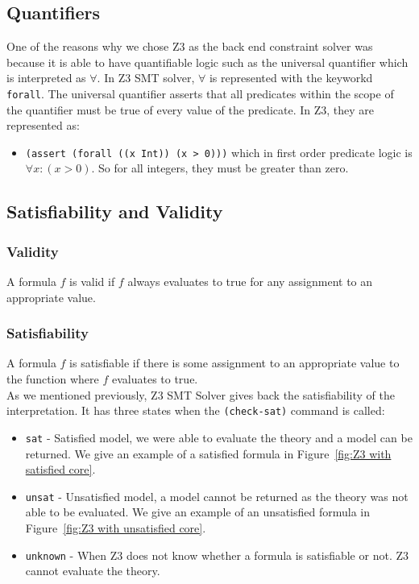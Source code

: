 \documentclass[a4paper]{report}
\begin{document}
\subsection{Quantifiers}
One of the reasons why we chose Z3 as the back end constraint solver was because it is able to have quantifiable logic such as the universal quantifier which is interpreted as  $\forall$. In Z3 SMT solver, $\forall$ is represented with the keyworkd \texttt{forall}. The universal quantifier asserts that all predicates within the scope of the quantifier must be true of every value of the predicate. In Z3, they are represented as:
\begin{itemize}
\item \texttt{(assert (forall ((x Int)) (x > 0)))} which in first order predicate logic is $\forall x: (x > 0)$. So for all integers, they must be greater than zero.
\end{itemize}

\subsection{Satisfiability and Validity}
\subsubsection{Validity}
A formula $f$ is valid if $f$ always evaluates to true for any assignment to an appropriate value. \\

\subsubsection{Satisfiability}
A formula $f$ is satisfiable if there is some assignment to an appropriate value to the function where $f$ evaluates to true.\\

As we mentioned previously, Z3 SMT Solver gives back the satisfiability of the interpretation. It has three states when the \texttt{(check-sat)} command is called:
\begin{itemize}
\item \texttt{sat} - Satisfied model, we were able to evaluate the theory and a model can be returned. We give an example of a satisfied formula in Figure~\ref{fig:Z3 with satisfied core}.
\item \texttt{unsat} - Unsatisfied model, a model cannot be returned as the theory was not able to be evaluated. We give an example of an unsatisfied formula in Figure~\ref{fig:Z3 with unsatisfied core}.
\item \texttt{unknown} - When Z3 does not know whether a formula is satisfiable or not. Z3 cannot evaluate the theory.
\end{itemize}
\end{document}
